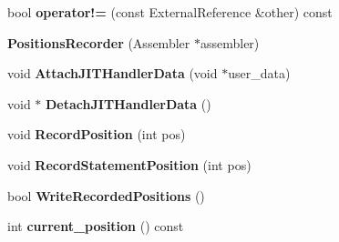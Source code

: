\begin{DoxyCompactItemize}
\item 
\hypertarget{classv8_1_1internal_1_1_b_a_s_e___e_m_b_e_d_d_e_d_a1551c456b1b6ebd43b7623b477bc90b9}{}bool {\bfseries operator!=} (const External\+Reference \&other) const \label{classv8_1_1internal_1_1_b_a_s_e___e_m_b_e_d_d_e_d_a1551c456b1b6ebd43b7623b477bc90b9}

\item 
\hypertarget{classv8_1_1internal_1_1_b_a_s_e___e_m_b_e_d_d_e_d_a0c356f4963667488a48ec74ba77f5d85}{}{\bfseries Positions\+Recorder} (Assembler $\ast$assembler)\label{classv8_1_1internal_1_1_b_a_s_e___e_m_b_e_d_d_e_d_a0c356f4963667488a48ec74ba77f5d85}

\item 
\hypertarget{classv8_1_1internal_1_1_b_a_s_e___e_m_b_e_d_d_e_d_a4f9fedb7d55414a54555f6be203bd776}{}void {\bfseries Attach\+J\+I\+T\+Handler\+Data} (void $\ast$user\+\_\+data)\label{classv8_1_1internal_1_1_b_a_s_e___e_m_b_e_d_d_e_d_a4f9fedb7d55414a54555f6be203bd776}

\item 
\hypertarget{classv8_1_1internal_1_1_b_a_s_e___e_m_b_e_d_d_e_d_a1789c1c786ba836ffd2d492e5503b024}{}void $\ast$ {\bfseries Detach\+J\+I\+T\+Handler\+Data} ()\label{classv8_1_1internal_1_1_b_a_s_e___e_m_b_e_d_d_e_d_a1789c1c786ba836ffd2d492e5503b024}

\item 
\hypertarget{classv8_1_1internal_1_1_b_a_s_e___e_m_b_e_d_d_e_d_af9aef8c349726d5e650fe7c5cff0cdfa}{}void {\bfseries Record\+Position} (int pos)\label{classv8_1_1internal_1_1_b_a_s_e___e_m_b_e_d_d_e_d_af9aef8c349726d5e650fe7c5cff0cdfa}

\item 
\hypertarget{classv8_1_1internal_1_1_b_a_s_e___e_m_b_e_d_d_e_d_a9c5d6790b1fca24dfa9b5dd881a82980}{}void {\bfseries Record\+Statement\+Position} (int pos)\label{classv8_1_1internal_1_1_b_a_s_e___e_m_b_e_d_d_e_d_a9c5d6790b1fca24dfa9b5dd881a82980}

\item 
\hypertarget{classv8_1_1internal_1_1_b_a_s_e___e_m_b_e_d_d_e_d_a7ff662873c444126357bcd4b43f0c3e6}{}bool {\bfseries Write\+Recorded\+Positions} ()\label{classv8_1_1internal_1_1_b_a_s_e___e_m_b_e_d_d_e_d_a7ff662873c444126357bcd4b43f0c3e6}

\item 
\hypertarget{classv8_1_1internal_1_1_b_a_s_e___e_m_b_e_d_d_e_d_a9228dc23aa43a2c3da2266d623787397}{}int {\bfseries current\+\_\+position} () const \label{classv8_1_1internal_1_1_b_a_s_e___e_m_b_e_d_d_e_d_a9228dc23aa43a2c3da2266d623787397}


\end{DoxyCompactItemize}
